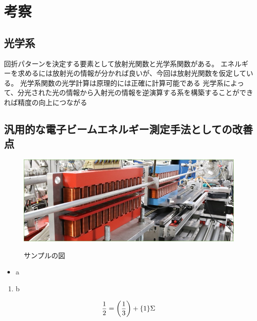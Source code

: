 \documentclass[a4paper,11pt,uplatex]{jsarticle}
\begin{document}
\section{考察}
\subsection{光学系}
回折パターンを決定する要素として放射光関数と光学系関数がある。
エネルギーを求めるには放射光の情報が分かれば良いが、今回は放射光関数を仮定している。
光学系関数の光学計算は原理的には正確に計算可能である
光学系によって、分光された光の情報から入射光の情報を逆演算する系を構築することができれば精度の向上につながる

\subsection{汎用的な電子ビームエネルギー測定手法としての改善点}






\clearpage

\begin{figure}[tb]
  \centering
  \includegraphics[width=0.8\linewidth]{image/1-1.jpg}\\
  \caption{サンプルの図}
  \label{sample_image}
\end{figure}

\begin{itemize}
  \item a
\end{itemize}
\begin{enumerate}
  \item b
\end{enumerate}

\begin{align}
\frac{1}{2} = \qty(\frac{1}{3}) + \qty{1}\Sigma
\end{align}
\end{document}
